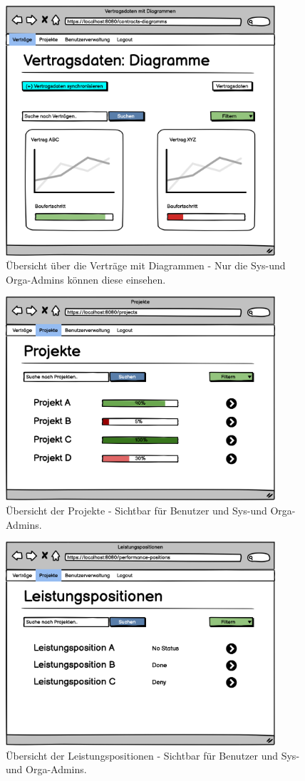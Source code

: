 \begin{figure}[h]
\centering
\includegraphics[width=10cm]{img/mockup_web/admin-vertraege-diagramme.png}
\caption{Übersicht über die Verträge mit Diagrammen - Nur die Sys-und Orga-Admins können diese einsehen.}
\end{figure}

\begin{figure}[h]
\centering
\includegraphics[width=10cm]{img/mockup_web/admin-und-benutzer-projekte.png}
\caption{Übersicht der Projekte - Sichtbar für Benutzer und Sys-und Orga-Admins.}
\end{figure}

\begin{figure}[h]
\centering
\includegraphics[width=10cm]{img/mockup_web/admin-und-benutzer-leistungspositionen.png}
\caption{Übersicht der Leistungspositionen - Sichtbar für Benutzer und Sys-und Orga-Admins.}
\end{figure}

